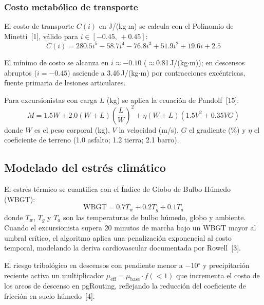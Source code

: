 \documentclass[10pt,letterpaper,twocolumn]{article}
\begin{document}
\subsubsection{Costo metab\'{o}lico de transporte}

El costo de transporte $C(i)$ en J/(kg$\cdot$m) se calcula con el
Polinomio de Minetti~[1], v\'{a}lido para $i\in[-0.45,\,{+}0.45]$:
\begin{equation}
  C(i) = 280.5i^{5} - 58.7i^{4} - 76.8i^{3} + 51.9i^{2} + 19.6i + 2.5
  \label{eq:minetti}
\end{equation}

El m\'{i}nimo de costo se alcanza en $i\approx{-}0.10$
($\approx$0.81\,J/(kg$\cdot$m)); en descensos abruptos ($i={-}0.45$)
asciende a 3.46\,J/(kg$\cdot$m) por contracciones exc\'{e}ntricas,
fuente primaria de lesiones articulares.

Para excursionistas con carga $L$ (kg) se aplica la ecuaci\'{o}n de
Pandolf~[15]:
\begin{equation}
  M = 1.5W + 2.0(W\!+\!L)\!\left(\!\frac{L}{W}\!\right)^{\!2}
      + \eta(W\!+\!L)(1.5V^{2} + 0.35VG)
  \label{eq:pandolf}
\end{equation}
donde $W$ es el peso corporal (kg), $V$ la velocidad (m/s), $G$ el
gradiente (\%) y $\eta$ el coeficiente de terreno (1.0 asfalto;
1.2 tierra; 2.1 barro).

\subsection{Modelado del estr\'{e}s clim\'{a}tico}

El estr\'{e}s t\'{e}rmico se cuantifica con el \'{I}ndice de Globo de
Bulbo H\'{u}medo (WBGT):
\begin{equation}
  \mathrm{WBGT} = 0.7T_{w} + 0.2T_{g} + 0.1T_{a}
  \label{eq:wbgt}
\end{equation}
donde $T_{w}$, $T_{g}$ y $T_{a}$ son las temperaturas de bulbo
h\'{u}medo, globo y ambiente. Cuando el excursionista supera 20 minutos
de marcha bajo un WBGT mayor al umbral cr\'{i}tico, el algoritmo aplica
una penalizaci\'{o}n exponencial al costo temporal, modelando la deriva
cardiovascular documentada por Rowell~[3].

El riesgo tribol\'{o}gico en descensos con pendiente menor a
$-10{^\circ}$ y precipitaci\'{o}n reciente activa un multiplicador
$\mu_{\mathrm{eff}} = \mu_{\mathrm{base}}\cdot f(<1)$ que incrementa el
costo de los arcos de descenso en pgRouting, reflejando la reducci\'{o}n
del coeficiente de fricci\'{o}n en suelo h\'{u}medo~[4].
\end{document}
